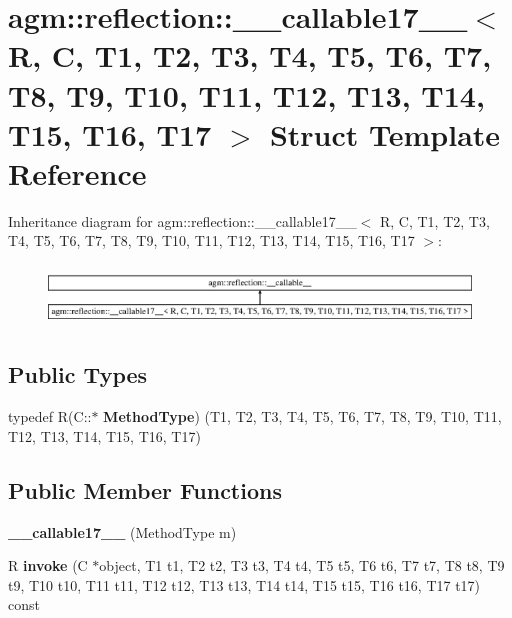 \hypertarget{structagm_1_1reflection_1_1____callable17____}{}\section{agm\+:\+:reflection\+:\+:\+\_\+\+\_\+callable17\+\_\+\+\_\+$<$ R, C, T1, T2, T3, T4, T5, T6, T7, T8, T9, T10, T11, T12, T13, T14, T15, T16, T17 $>$ Struct Template Reference}
\label{structagm_1_1reflection_1_1____callable17____}
Inheritance diagram for agm\+:\+:reflection\+:\+:\+\_\+\+\_\+callable17\+\_\+\+\_\+$<$ R, C, T1, T2, T3, T4, T5, T6, T7, T8, T9, T10, T11, T12, T13, T14, T15, T16, T17 $>$\+:\begin{figure}[H]
\begin{center}
\leavevmode
\includegraphics[height=1.620839cm]{structagm_1_1reflection_1_1____callable17____}
\end{center}
\end{figure}
\subsection*{Public Types}
\begin{DoxyCompactItemize}
\item 
typedef R(C\+::$\ast$ {\bfseries Method\+Type}) (T1, T2, T3, T4, T5, T6, T7, T8, T9, T10, T11, T12, T13, T14, T15, T16, T17)\hypertarget{structagm_1_1reflection_1_1____callable17_____afa88194802f4697b51c331ba19680300}{}\label{structagm_1_1reflection_1_1____callable17_____afa88194802f4697b51c331ba19680300}

\end{DoxyCompactItemize}
\subsection*{Public Member Functions}
\begin{DoxyCompactItemize}
\item 
{\bfseries \+\_\+\+\_\+callable17\+\_\+\+\_\+} (Method\+Type m)\hypertarget{structagm_1_1reflection_1_1____callable17_____a9f13c89acb850db21ca363b97284f515}{}\label{structagm_1_1reflection_1_1____callable17_____a9f13c89acb850db21ca363b97284f515}

\item 
R {\bfseries invoke} (C $\ast$object, T1 t1, T2 t2, T3 t3, T4 t4, T5 t5, T6 t6, T7 t7, T8 t8, T9 t9, T10 t10, T11 t11, T12 t12, T13 t13, T14 t14, T15 t15, T16 t16, T17 t17) const \hypertarget{structagm_1_1reflection_1_1____callable17_____ab2f81b499f512b9d6b68a2416db5d233}{}\label{structagm_1_1reflection_1_1____callable17_____ab2f81b499f512b9d6b68a2416db5d233}

\end{DoxyCompactItemize}
